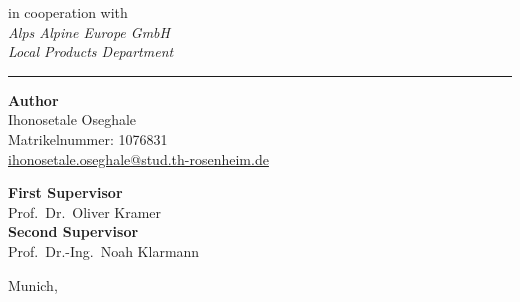 \begin{titlepage}

    \begin{center}
        {\normalsize in cooperation with}\\[0.25cm]
        {\normalsize\itshape Alps Alpine Europe GmbH}\\[0.1cm]
        {\small\itshape Local Products Department}
    \end{center}


    \noindent\rule{\textwidth}{0.4pt}

    \vspace{0.7cm}

    \noindent
    \begin{minipage}[t]{0.48\textwidth}
        \raggedright
        {\small
         \textbf{Author}\\[0.15cm]
         Ihonosetale Oseghale\\
         Matrikelnummer: 1076831\\
         \href{mailto:ihonosetale.oseghale@stud.th-rosenheim.de}%
              {ihonosetale.oseghale@stud.th-rosenheim.de}\par}
    \end{minipage}
    \hfill
    \begin{minipage}[t]{0.48\textwidth}
        \raggedright
        {\small
         \textbf{First Supervisor}\\[0.15cm]
         Prof.\ Dr.\ Oliver Kramer\\[0.5cm]
         \textbf{Second Supervisor}\\[0.15cm]
         Prof.\ Dr.-Ing.\ Noah Klarmann\par}
    \end{minipage}

    \vspace{0.9cm}

    \begin{center}
        {\small Munich, \submissiondate}
    \end{center}

    \restoregeometry

\end{titlepage}
